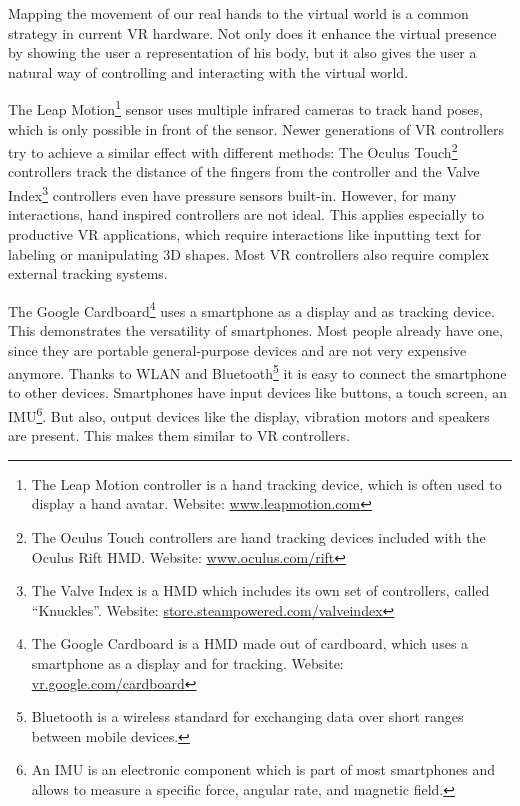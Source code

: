 Mapping the movement of our real hands to the virtual world is a common strategy in current \ac{VR} hardware. Not only does it enhance the virtual presence by showing the user a representation of his body, but it also gives the user a natural way of controlling and interacting with the virtual world. 

The Leap Motion\footnote{The Leap Motion controller is a hand tracking device, which is often used to display a hand avatar. Website: \href{https://www.leapmotion.com/}{www.leapmotion.com}} sensor uses multiple infrared cameras to track hand poses, which is only possible in front of the sensor. Newer generations of \ac{VR} controllers try to achieve a similar effect with different methods: The Oculus Touch\footnote{The Oculus Touch controllers are hand tracking devices included with the Oculus Rift \ac{HMD}. Website: \href{https://www.oculus.com/rift/}{www.oculus.com/rift}} controllers track the distance of the fingers from the controller and the Valve Index\footnote{The Valve Index is a \ac{HMD} which includes its own set of controllers, called \enquote{Knuckles}. Website: \href{https://store.steampowered.com/valveindex}{store.steampowered.com/valveindex}} controllers even have pressure sensors built-in.
However, for many interactions, hand inspired controllers are not ideal. This applies especially to productive \ac{VR} applications, which require interactions like inputting text for labeling or manipulating \ac{3D} shapes. Most \ac{VR} controllers also require complex external tracking systems. 

The Google Cardboard\footnote{The Google Cardboard is a \ac{HMD} made out of cardboard, which uses a smartphone as a display and for tracking. Website: \href{https://vr.google.com/cardboard/}{vr.google.com/cardboard}} uses a smartphone as a display and as tracking device. This demonstrates the versatility of smartphones. Most people already have one, since they are portable general-purpose devices and are not very expensive anymore. Thanks to \ac{WLAN} and Bluetooth\footnote{Bluetooth is a wireless standard for exchanging data over short ranges between mobile devices.} it is easy to connect the smartphone to other devices. Smartphones have input devices like buttons, a touch screen, an \ac{IMU}\footnote{An IMU is an electronic component which is part of most smartphones and allows to measure a specific force, angular rate, and magnetic field.}. But also, output devices like the display, vibration motors and speakers are present. This makes them similar to \ac{VR} controllers. 

